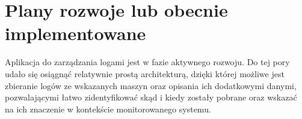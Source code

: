 \section{Plany rozwoje lub obecnie implementowane}
\label{chapter:application:plans}

Aplikacja do zarządzania logami jest w fazie aktywnego rozwoju. 
Do tej pory udało się osiągnąć relatywnie prostą architekturą, dzięki której
możliwe jest zbieranie logów ze wskazanych maszyn oraz opisania ich
dodatkowymi danymi, pozwalającymi łatwo zidentyfikować skąd i kiedy
zostały pobrane oraz wskazać na ich znaczenie w kontekście monitorowanego systemu.




